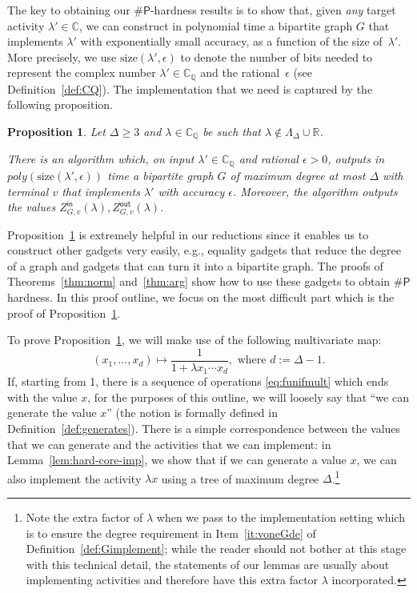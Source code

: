\documentclass[11pt]{article}
\newtheorem{proposition}[theorem]{Proposition}
\def\numP{\#\mathsf{P}}
\def\Zin{Z^{\mathsf{in}}}
\def\Zout{Z^{\mathsf{out}}}
\def\Reals{\mathbb{R}}
\def\Complex{\mathbb{C}}
\def\CQ{\mathbb{C}_{\mathbb{Q}}}
\newcommand{\size}[1]{\mathrm{size}(#1)}
\def\LambdaD{\Lambda_\Delta}
\newcommand{\eps}{\epsilon}
\begin{document}
The key to obtaining our $\numP$-hardness results is to show that, given \emph{any} target activity $\lambda'\in \Complex$, we can construct in  polynomial time a bipartite graph $G$ that implements $\lambda'$ with exponentially small accuracy,
as a function of the size of~$\lambda'$. More precisely, we
use $\size{\lambda',\eps}$ to denote the number of bits needed to represent 
the complex number $\lambda' \in \CQ$ and the rational~$\epsilon$ (see Definition~\ref{def:CQ}).
The implementation that we need is captured by the following proposition. 
\newcommand{\statelemcomplexexp}{Let $\Delta\geq 3$ and $\lambda \in \CQ$ be such that  $\lambda\notin \LambdaD\cup \Reals$. 


There is an algorithm which, on input $\lambda'\in \CQ$ and rational $\eps>0$, outputs in $poly(\size{\lambda',\eps})$ time a bipartite graph $G$ of maximum degree at most  $\Delta$ with terminal $v$ that implements $\lambda'$ with accuracy $\eps$. Moreover, the algorithm outputs the values $\Zin_{G,v}(\lambda),\Zout_{G,v}(\lambda)$.}
\begin{proposition}\label{lem:complexexp}
\statelemcomplexexp
\end{proposition}
Proposition~\ref{lem:complexexp} is extremely helpful in our reductions since it enables us to construct other gadgets very easily, e.g., equality gadgets that reduce the degree of a graph and gadgets  that can turn it into  a bipartite graph. The proofs of  Theorems~\ref{thm:norm} and~\ref{thm:arg} show how to use these gadgets to obtain $\numP$ hardness. In this proof outline, we focus on the  most difficult part which is the proof   of Proposition~\ref{lem:complexexp}.



To prove Proposition~\ref{lem:complexexp}, we will make use of the following multivariate map:
\begin{equation}\label{eq:funifmult}
(x_1,\hdots,x_{d})\mapsto \frac{1}{1+\lambda x_1\cdots x_d }, \mbox{ where } d:=\Delta-1.
\end{equation}
If, starting from 1, there is a sequence of operations \eqref{eq:funifmult} which ends with the value $x$, for the purposes of this outline, we will loosely say that ``we can generate the value $x$'' (the notion is formally defined in Definition~\ref{def:generates}). There is a simple correspondence between the values that we can generate and the activities that we can implement:  in Lemma~\ref{lem:hard-core-imp}, we show that if we can generate a value $x$, we can also implement the activity $\lambda x$ using a tree of maximum degree  $\Delta$.\footnote{\label{foot:generates}Note the extra factor of $\lambda$ when we pass to the implementation setting which  is to ensure the degree requirement in Item~\ref{it:voneGde} of Definition~\ref{def:Gimplement}; while the reader should not bother at this stage with this technical detail, the statements of our lemmas are usually about implementing activities and therefore have this extra factor $\lambda$ incorporated.} 
\end{document}
